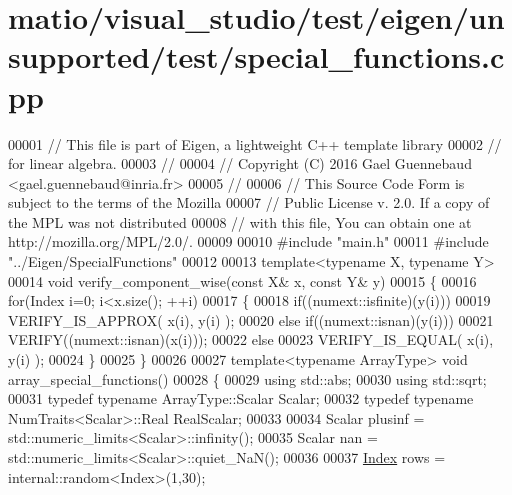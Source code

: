 \hypertarget{matio_2visual__studio_2test_2eigen_2unsupported_2test_2special__functions_8cpp_source}{}\section{matio/visual\+\_\+studio/test/eigen/unsupported/test/special\+\_\+functions.cpp}
\label{matio_2visual__studio_2test_2eigen_2unsupported_2test_2special__functions_8cpp_source}

\begin{DoxyCode}
00001 \textcolor{comment}{// This file is part of Eigen, a lightweight C++ template library}
00002 \textcolor{comment}{// for linear algebra.}
00003 \textcolor{comment}{//}
00004 \textcolor{comment}{// Copyright (C) 2016 Gael Guennebaud <gael.guennebaud@inria.fr>}
00005 \textcolor{comment}{//}
00006 \textcolor{comment}{// This Source Code Form is subject to the terms of the Mozilla}
00007 \textcolor{comment}{// Public License v. 2.0. If a copy of the MPL was not distributed}
00008 \textcolor{comment}{// with this file, You can obtain one at http://mozilla.org/MPL/2.0/.}
00009 
00010 \textcolor{preprocessor}{#include "main.h"}
00011 \textcolor{preprocessor}{#include "../Eigen/SpecialFunctions"}
00012 
00013 \textcolor{keyword}{template}<\textcolor{keyword}{typename} X, \textcolor{keyword}{typename} Y>
00014 \textcolor{keywordtype}{void} verify\_component\_wise(\textcolor{keyword}{const} X& x, \textcolor{keyword}{const} Y& y)
00015 \{
00016   \textcolor{keywordflow}{for}(Index i=0; i<x.size(); ++i)
00017   \{
00018     \textcolor{keywordflow}{if}((numext::isfinite)(y(i)))
00019       VERIFY\_IS\_APPROX( x(i), y(i) );
00020     \textcolor{keywordflow}{else} \textcolor{keywordflow}{if}((numext::isnan)(y(i)))
00021       VERIFY((numext::isnan)(x(i)));
00022     \textcolor{keywordflow}{else}
00023       VERIFY\_IS\_EQUAL( x(i), y(i) );
00024   \}
00025 \}
00026 
00027 \textcolor{keyword}{template}<\textcolor{keyword}{typename} ArrayType> \textcolor{keywordtype}{void} array\_special\_functions()
00028 \{
00029   \textcolor{keyword}{using} std::abs;
00030   \textcolor{keyword}{using} std::sqrt;
00031   \textcolor{keyword}{typedef} \textcolor{keyword}{typename} ArrayType::Scalar Scalar;
00032   \textcolor{keyword}{typedef} \textcolor{keyword}{typename} NumTraits<Scalar>::Real RealScalar;
00033 
00034   Scalar plusinf = std::numeric\_limits<Scalar>::infinity();
00035   Scalar nan = std::numeric\_limits<Scalar>::quiet\_NaN();
00036 
00037   \hyperlink{namespace_eigen_a62e77e0933482dafde8fe197d9a2cfde}{Index} rows = internal::random<Index>(1,30);

\end{DoxyCode}

